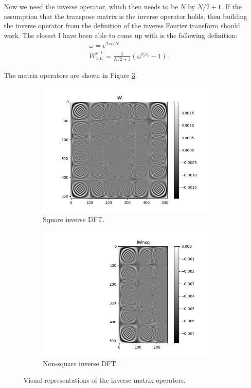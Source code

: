 \documentclass{article}
\begin{document}
Now we need the inverse operator, which then needs to be $N$ by $N/2+1$.
If the assumption that the transpose matrix is the inverse operator holds, then building the inverse operator from the definition of the inverse Fourier transform should work.
The closest I have been able to come up with is the following definition:
\begin{align}
	&\omega = e^{2\pi i / N}\\
	&W^{r^{-1}}_{x_i \nu_i} = \frac{1}{N/2 +1} (\omega^{\nu_i x_i} - 1).
\end{align}

The matrix operators are shown in Figure \ref{fig:idft}.

\begin{figure}[ht]
	\centering
	\begin{subfigure}{.45\textwidth}
		\centering
		\includegraphics[width=\linewidth]{Figures/idft.png}
		\caption{Square inverse DFT.}
		\label{fig:idft-square}
	\end{subfigure}
	\begin{subfigure}{.45\textwidth}
		\centering
		\includegraphics[width=\linewidth]{Figures/idft_non_square.png}
		\caption{Non-square inverse DFT.}
		\label{fig:idft-non-square}
	\end{subfigure}
	\caption{Visual representations of the inverse matrix operators.}
	\label{fig:idft}
\end{figure}
\end{document}
